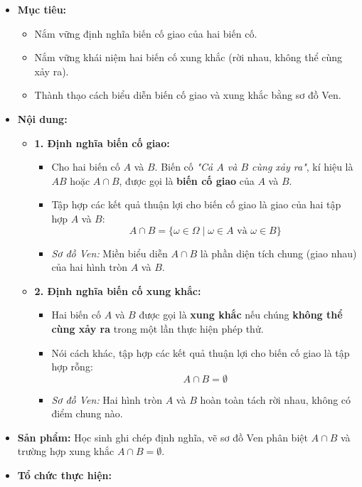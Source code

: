 \documentclass[12pt, a4paper]{article}
\begin{document}
\begin{itemize}[leftmargin=1.2cm]
    \item[a)] \textbf{Mục tiêu:}
    \begin{itemize}[leftmargin=0.6cm]
        \item Nắm vững định nghĩa biến cố giao của hai biến cố.
        \item Nắm vững khái niệm hai biến cố xung khắc (rời nhau, không thể cùng xảy ra).
        \item Thành thạo cách biểu diễn biến cố giao và xung khắc bằng sơ đồ Ven.
    \end{itemize}

    \item[b)] \textbf{Nội dung:}
    \begin{itemize}[leftmargin=0.6cm]
        \item \textbf{1. Định nghĩa biến cố giao:}
        \begin{itemize}
            \item Cho hai biến cố $A$ và $B$. Biến cố \textit{"Cả $A$ và $B$ cùng xảy ra"}, kí hiệu là $AB$ hoặc $A \cap B$, được gọi là \textbf{biến cố giao} của $A$ và $B$.
            \item Tập hợp các kết quả thuận lợi cho biến cố giao là giao của hai tập hợp $A$ và $B$:
            $$A \cap B = \{\omega \in \Omega \mid \omega \in A \text{ và } \omega \in B\}$$
            \item \textit{Sơ đồ Ven:} Miền biểu diễn $A \cap B$ là phần diện tích chung (giao nhau) của hai hình tròn $A$ và $B$.
        \end{itemize}

        \item \textbf{2. Định nghĩa biến cố xung khắc:}
        \begin{itemize}
            \item Hai biến cố $A$ và $B$ được gọi là \textbf{xung khắc} nếu chúng \textbf{không thể cùng xảy ra} trong một lần thực hiện phép thử.
            \item Nói cách khác, tập hợp các kết quả thuận lợi cho biến cố giao là tập hợp rỗng:
            $$A \cap B = \emptyset$$
            \item \textit{Sơ đồ Ven:} Hai hình tròn $A$ và $B$ hoàn toàn tách rời nhau, không có điểm chung nào.
        \end{itemize}
    \end{itemize}

    \item[c)] \textbf{Sản phẩm:} Học sinh ghi chép định nghĩa, vẽ sơ đồ Ven phân biệt $A \cap B$ và trường hợp xung khắc $A \cap B = \emptyset$.
    \item[d)] \textbf{Tổ chức thực hiện:}
\end{itemize}
\end{document}
